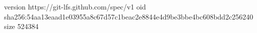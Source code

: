 version https://git-lfs.github.com/spec/v1
oid sha256:54aa13eaad1e03955a8c67d57c1beac2e8844e4d9be3bbe4bc608bdd2c256240
size 524384
